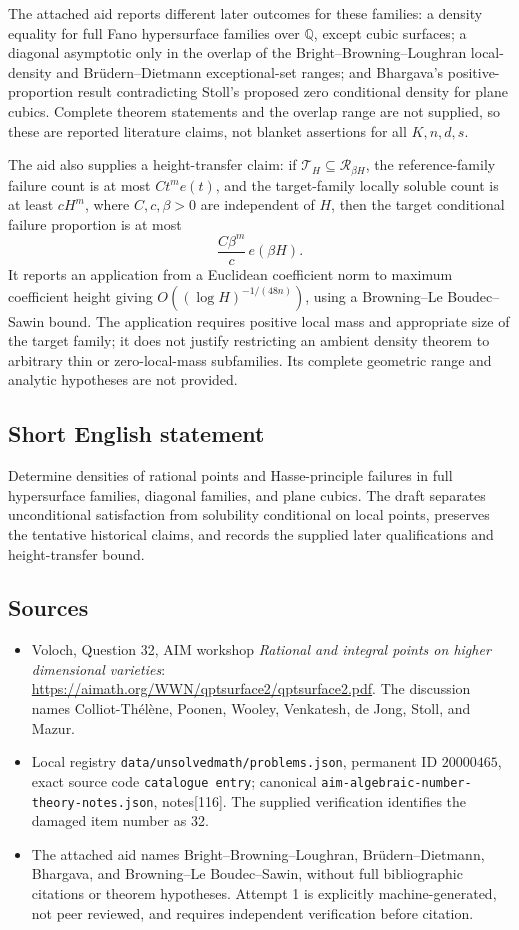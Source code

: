 \documentclass[11pt]{article}
\newcommand{\Q}{\mathbb{Q}}
\begin{document}
The attached aid reports different later outcomes for these families: a density equality for full Fano hypersurface families over \(\Q\), except cubic surfaces; a diagonal asymptotic only in the overlap of the Bright--Browning--Loughran local-density and Br\"udern--Dietmann exceptional-set ranges; and Bhargava's positive-proportion result contradicting Stoll's proposed zero conditional density for plane cubics. Complete theorem statements and the overlap range are not supplied, so these are reported literature claims, not blanket assertions for all \(K,n,d,s\).

The aid also supplies a height-transfer claim: if \(\mathcal T_H\subseteq\mathcal R_{\beta H}\), the reference-family failure count is at most \(Ct^m e(t)\), and the target-family locally soluble count is at least \(cH^m\), where \(C,c,\beta>0\) are independent of \(H\), then the target conditional failure proportion is at most
\[
\frac{C\beta^m}{c}\,e(\beta H).
\]
It reports an application from a Euclidean coefficient norm to maximum coefficient height giving \(O((\log H)^{-1/(48n)})\), using a Browning--Le Boudec--Sawin bound. The application requires positive local mass and appropriate size of the target family; it does not justify restricting an ambient density theorem to arbitrary thin or zero-local-mass subfamilies. Its complete geometric range and analytic hypotheses are not provided.
\subsection{Short English statement}
Determine densities of rational points and Hasse-principle failures in full hypersurface families, diagonal families, and plane cubics. The draft separates unconditional satisfaction from solubility conditional on local points, preserves the tentative historical claims, and records the supplied later qualifications and height-transfer bound.
\subsection{Sources}
\begin{itemize}
\item Voloch, Question 32, AIM workshop \emph{Rational and integral points on higher dimensional varieties}: \url{https://aimath.org/WWN/qptsurface2/qptsurface2.pdf}. The discussion names Colliot-Th\'el\`ene, Poonen, Wooley, Venkatesh, de Jong, Stoll, and Mazur.
\item Local registry \texttt{data/unsolvedmath/problems.json}, permanent ID \(20000465\), exact source code \texttt{catalogue entry}; canonical \texttt{aim-algebraic-number-theory-notes.json}, notes[116]. The supplied verification identifies the damaged item number as 32.
\item The attached aid names Bright--Browning--Loughran, Br\"udern--Dietmann, Bhargava, and Browning--Le Boudec--Sawin, without full bibliographic citations or theorem hypotheses. Attempt 1 is explicitly machine-generated, not peer reviewed, and requires independent verification before citation.
\end{itemize}
\end{document}
